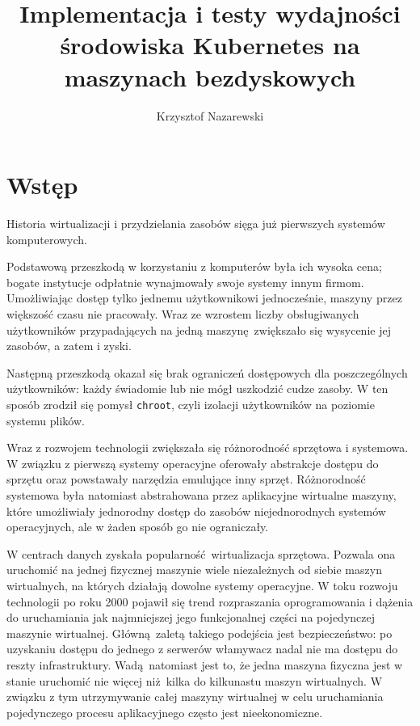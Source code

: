 \documentclass[a4paper,12pt,twoside,openany]{report}
\title{Implementacja i testy wydajności środowiska Kubernetes na maszynach bezdyskowych}
\author{Krzysztof Nazarewski}
\newcommand{\passthrough}[1]{#1}
\begin{document}
\maketitle
\hypertarget{wstux119p}{%
\chapter{Wstęp}\label{wstux119p}}

Historia wirtualizacji i przydzielania zasobów sięga już pierwszych
systemów komputerowych.

Podstawową przeszkodą w korzystaniu z komputerów była ich wysoka cena;
bogate instytucje odpłatnie wynajmowały swoje systemy innym firmom.
Umożliwiając dostęp tylko jednemu użytkownikowi jednocześnie, maszyny
przez większość czasu nie pracowały. Wraz ze wzrostem liczby
obsługiwanych użytkowników przypadających na jedną maszynę~zwiększało
się wysycenie jej zasobów, a zatem i zyski.

Następną przeszkodą okazał się brak ograniczeń dostępowych dla
poszczególnych użytkowników: każdy świadomie lub nie mógł uszkodzić
cudze zasoby. W ten sposób zrodził się pomysł
\passthrough{\lstinline!chroot!}, czyli izolacji użytkowników na
poziomie systemu plików.

Wraz z rozwojem technologii zwiększała się różnorodność sprzętowa i
systemowa. W związku z pierwszą systemy operacyjne oferowały abstrakcje
dostępu do sprzętu oraz powstawały narzędzia emulujące inny sprzęt.
Różnorodność systemowa była natomiast abstrahowana przez aplikacyjne
wirtualne maszyny, które umożliwiały jednorodny dostęp do zasobów
niejednorodnych systemów operacyjnych, ale w żaden sposób go nie
ograniczały.

W centrach danych zyskała popularność~wirtualizacja sprzętowa. Pozwala
ona uruchomić na jednej fizycznej maszynie wiele niezależnych od siebie
maszyn wirtualnych, na których działają dowolne systemy operacyjne. W
toku rozwoju technologii po roku 2000 pojawił się trend rozpraszania
oprogramowania i dążenia do uruchamiania jak najmniejszej jego
funkcjonalnej części na pojedynczej maszynie wirtualnej. Główną~zaletą
takiego podejścia jest bezpieczeństwo: po uzyskaniu dostępu do jednego z
serwerów włamywacz nadal nie ma dostępu do reszty infrastruktury.
Wadą~natomiast jest to, że jedna maszyna fizyczna jest w stanie
uruchomić nie więcej niż~kilka do kilkunastu maszyn wirtualnych. W
związku z tym utrzymywanie całej maszyny wirtualnej w celu uruchamiania
pojedynczego procesu aplikacyjnego często jest nieekonomiczne.
\end{document}
